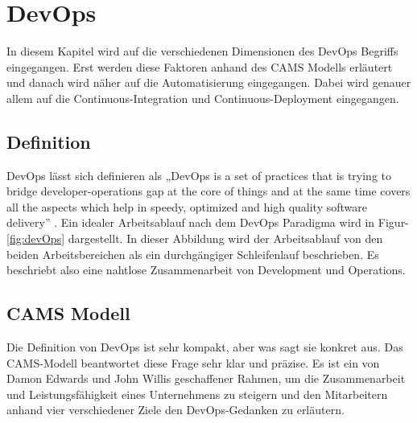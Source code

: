 \chapter{DevOps}
\label{cha:relatedwork}

In diesem Kapitel wird auf die verschiedenen Dimensionen des DevOps Begriffs eingegangen. Erst werden diese Faktoren anhand des CAMS Modells erläutert und danach wird näher auf die Automatisierung eingegangen. Dabei wird genauer allem auf die Continuous-Integration und Continuous-Deployment eingegangen.

\section{Definition}
DevOps lässt sich definieren als „DevOps is a set of practices that is trying to bridge developer-operations gap at the core of things
and at the same time covers all the aspects which help in speedy, optimized and high quality software
delivery” \cite[p. 22]{nagpal2014literature}. Ein idealer Arbeitsablauf nach dem DevOps Paradigma wird in Figur-\ref{fig:devOps} dargestellt. In dieser Abbildung wird der Arbeitsablauf von den beiden Arbeitsbereichen als ein durchgängiger Schleifenlauf beschrieben. Es beschriebt also eine nahtlose Zusammenarbeit von Development und Operations.


\section{CAMS Modell}
Die Definition von DevOps ist sehr kompakt, aber was sagt sie konkret aus. Das CAMS-Modell beantwortet diese Frage sehr klar und präzise. Es ist ein von Damon Edwards und John Willis geschaffener Rahmen, um die Zusammenarbeit und Leistungsfähigkeit eines Unternehmens zu steigern und den Mitarbeitern anhand vier verschiedener Ziele den DevOps-Gedanken zu erläutern.
